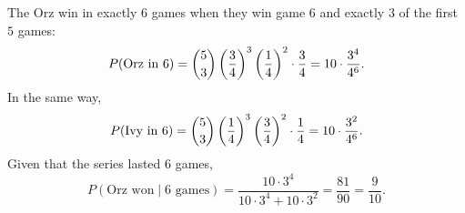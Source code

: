 The Orz win in exactly $6$ games when they win game $6$ and exactly $3$ of the first $5$ games:
\[P(\text{Orz in }6)=\dbinom53\left(\dfrac34\right)^3\left(\dfrac14\right)^2\cdot\dfrac34=10\cdot\dfrac{3^4}{4^6}.\]
In the same way,
\[P(\text{Ivy in }6)=\dbinom53\left(\dfrac14\right)^3\left(\dfrac34\right)^2\cdot\dfrac14=10\cdot\dfrac{3^2}{4^6}.\]
Given that the series lasted $6$ games,
\[P(\text{Orz won}\mid 6\text{ games})=\dfrac{10\cdot3^4}{10\cdot3^4+10\cdot3^2}=\dfrac{81}{90}=\boxed{\dfrac{9}{10}}.\]
